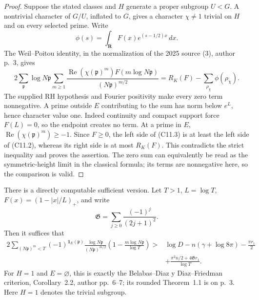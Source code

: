 \begin{proof}
Suppose the stated classes and \(H\) generate a proper
subgroup \(U<G\). A nontrivial character of \(G/U\), inflated
to \(G\), gives a character \(\chi\ne1\) trivial on \(H\)
and on every selected prime. Write
\[
       \phi(s)=\int_{\mathbf R}F(x)e^{(s-1/2)x}\,dx.
\]
The Weil--Poitou identity, in the normalization of the
2025 source (3), author p.~3, gives
\[
 2\sum_{\mathfrak p}\log N\mathfrak p
       \sum_{m\ge1}
       \frac{\operatorname{Re}(\chi(\mathfrak p)^m)
                          F(m\log N\mathfrak p)}
                              {(N\mathfrak p)^{m/2}}
       =R_K(F)-\sum_{\rho_\chi}\phi(\rho_\chi).
                                                               \tag{C11.3}
\]
The supplied RH hypothesis and Fourier positivity make every
zero term nonnegative. A prime outside \(E\) contributing to
the sum has norm below \(e^L\), hence character value one.
Indeed continuity and compact support force \(F(L)=0\),
so the endpoint creates no term. At a prime in \(E\),
\(\operatorname{Re}(\chi(\mathfrak p)^m)\ge-1\).
Since \(F\ge0\), the left side of (C11.3) is at least
the left side of (C11.2), whereas its right side is at most
\(R_K(F)\). This contradicts the strict inequality and
proves the assertion. The zero sum can equivalently be
read as the symmetric-height limit in the classical formula;
its terms are nonnegative here, so the comparison is valid.
\end{proof}

There is a directly computable sufficient version. Let \(T>1\),
\(L=\log T\), \(F(x)=(1-|x|/L)_+\), and write
\[
 {\mathfrak G}=\sum_{j\ge0}\frac{(-1)^j}{(2j+1)^2}.
\]
Then it suffices that
\[
 \begin{split}
 2\sum_{(N\mathfrak p)^m<T}
   (-1)^{\mathbf1_E(\mathfrak p)}
   \frac{\log N\mathfrak p}{(N\mathfrak p)^{m/2}}
        \left(1-\frac{m\log N\mathfrak p}{\log T}\right)
 >{}&\log D-n(\gamma+\log8\pi)-\frac{\pi r_1}{2}\\
    &+\frac{\pi^2 n/2+4{\mathfrak G}r_1}{\log T}.
 \end{split}                                                    \tag{C11.4}
\]
For \(H=1\) and \(E=\varnothing\), this is exactly the
Belabas--Diaz y Diaz--Friedman criterion, Corollary~2.2,
author pp.~6--7; its rounded Theorem~1.1 is on p.~3.
Here \(H=1\) denotes the trivial subgroup.

